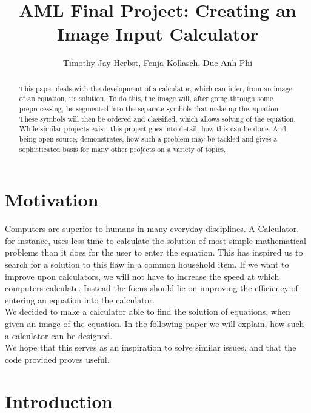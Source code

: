 \documentclass[12pt]{article}
\title{AML Final Project: Creating an Image Input Calculator} %
\author{Timothy Jay Herbst, Fenja Kollasch, Duc Anh Phi}
\begin{document}
\maketitle

\begin{abstract}
	This paper deals with the development of a calculator, which can infer, from an image of an equation, its solution.
	To do this, the image will, after going through some preprocessing, be segmented into the separate symbols that make up the equation.
	These symbols will then be ordered and classified, which allows solving of the equation.
	While similar projects exist, this project goes into detail, how this can be done.
	And, being open source, demonstrates, how such a problem may be tackled and gives a sophisticated basis for many other projects on a variety of topics.
	
	
	
\end{abstract}
\newpage

\tableofcontents

\newpage
\section{Motivation}

Computers are superior to humans in many everyday disciplines.
A Calculator, for instance, uses less time to calculate the solution of most simple mathematical problems than it does for the user to enter the equation.
This has inspired us to search for a solution to this flaw in a common household item.
If we want to improve upon calculators, we will not have to increase the speed at which computers calculate.
Instead the focus should lie on improving the efficiency of entering an equation into the calculator.\\
We decided to make a calculator able to find the solution of equations, when given an image of the equation.
In the following paper we will explain, how such a calculator can be designed.\\
We hope that this serves as an inspiration to solve similar issues, and that the code provided proves useful.

\section{Introduction}

	
\end{document}
